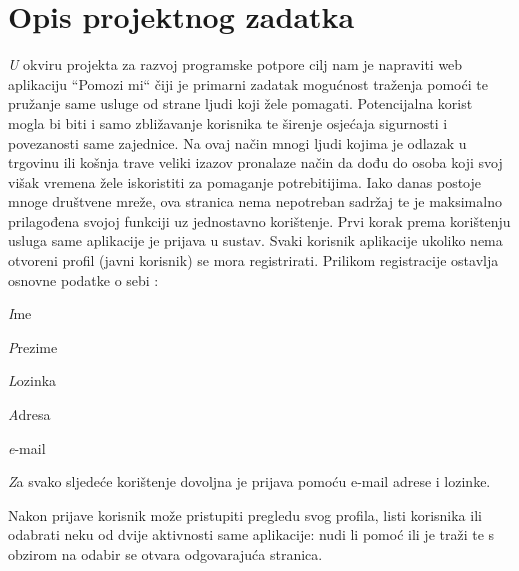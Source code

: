 \chapter{Opis projektnog zadatka}
		
		
		\textit U okviru projekta za razvoj programske potpore cilj nam je napraviti web aplikaciju 
“Pomozi mi“ čiji je primarni zadatak mogućnost traženja pomoći te pružanje same usluge od strane ljudi koji žele pomagati. Potencijalna korist mogla bi biti i samo zbližavanje korisnika te širenje osjećaja sigurnosti i povezanosti same zajednice. Na ovaj način mnogi ljudi kojima je odlazak u trgovinu ili košnja trave veliki izazov pronalaze način da dođu do osoba koji svoj višak vremena žele iskoristiti za pomaganje potrebitijima. Iako danas postoje mnoge društvene mreže, ova stranica nema nepotreban sadržaj te je maksimalno prilagođena svojoj funkciji uz jednostavno korištenje. \newline
Prvi korak prema korištenju usluga same aplikacije je prijava u sustav.
Svaki korisnik aplikacije ukoliko nema otvoreni profil (javni korisnik) se mora registrirati. Prilikom registracije ostavlja osnovne podatke o sebi :

		\begin{packed_item}
			\item \textit Ime
			\item \textit Prezime
			\item \textit Lozinka
			\item \textit Adresa
			\item \textit e-mail
		\end{packed_item}
		
		\textit Za svako sljedeće korištenje dovoljna je prijava pomoću e-mail adrese i lozinke.

Nakon prijave korisnik može pristupiti pregledu svog profila, listi korisnika ili odabrati neku od dvije aktivnosti same aplikacije: nudi li pomoć ili je traži te s obzirom na odabir se otvara odgovarajuća stranica. 

		\eject

